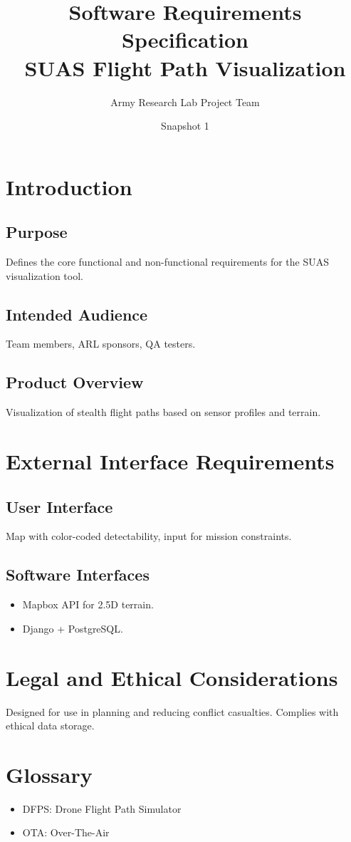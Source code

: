 \documentclass[12pt]{article}
\title{Software Requirements Specification\\SUAS Flight Path Visualization}
\author{Army Research Lab Project Team}
\date{Snapshot 1}
\begin{document}
\maketitle

\tableofcontents
\newpage

\section{Introduction}
\subsection{Purpose}
Defines the core functional and non-functional requirements for the SUAS visualization tool.

\subsection{Intended Audience}
Team members, ARL sponsors, QA testers.

\subsection{Product Overview}
Visualization of stealth flight paths based on sensor profiles and terrain.

\section{External Interface Requirements}
\subsection{User Interface}
Map with color-coded detectability, input for mission constraints.

\subsection{Software Interfaces}
\begin{itemize}
  \item Mapbox API for 2.5D terrain.
  \item Django + PostgreSQL.
\end{itemize}

\section{Legal and Ethical Considerations}
Designed for use in planning and reducing conflict casualties. Complies with ethical data storage.

\section{Glossary}
\begin{itemize}
  \item DFPS: Drone Flight Path Simulator
  \item OTA: Over-The-Air
\end{itemize}
\end{document}

